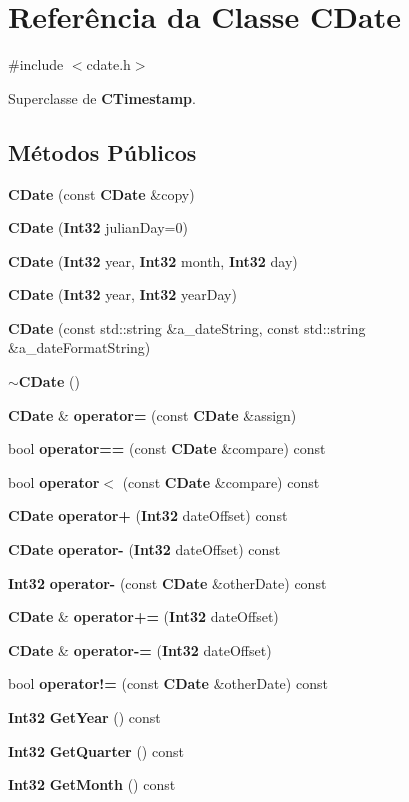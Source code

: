 \section{Referência da Classe C\+Date}
\label{class_c_date}


{\ttfamily \#include $<$cdate.\+h$>$}



Superclasse de {\bf C\+Timestamp}.

\subsection*{Métodos Públicos}
\begin{DoxyCompactItemize}
\item 
{\bf C\+Date} (const {\bf C\+Date} \&copy)
\item 
{\bf C\+Date} ({\bf Int32} julian\+Day=0)
\item 
{\bf C\+Date} ({\bf Int32} year, {\bf Int32} month, {\bf Int32} day)
\item 
{\bf C\+Date} ({\bf Int32} year, {\bf Int32} year\+Day)
\item 
{\bf C\+Date} (const std\+::string \&a\+\_\+date\+String, const std\+::string \&a\+\_\+date\+Format\+String)
\item 
{\bf $\sim$\+C\+Date} ()
\item 
{\bf C\+Date} \& {\bf operator=} (const {\bf C\+Date} \&assign)
\item 
bool {\bf operator==} (const {\bf C\+Date} \&compare) const 
\item 
bool {\bf operator$<$} (const {\bf C\+Date} \&compare) const 
\item 
{\bf C\+Date} {\bf operator+} ({\bf Int32} date\+Offset) const 
\item 
{\bf C\+Date} {\bf operator-\/} ({\bf Int32} date\+Offset) const 
\item 
{\bf Int32} {\bf operator-\/} (const {\bf C\+Date} \&other\+Date) const 
\item 
{\bf C\+Date} \& {\bf operator+=} ({\bf Int32} date\+Offset)
\item 
{\bf C\+Date} \& {\bf operator-\/=} ({\bf Int32} date\+Offset)
\item 
bool {\bf operator!=} (const {\bf C\+Date} \&other\+Date) const 
\item 
{\bf Int32} {\bf Get\+Year} () const 
\item 
{\bf Int32} {\bf Get\+Quarter} () const 
\item 
{\bf Int32} {\bf Get\+Month} () const 

\end{DoxyCompactItemize}
